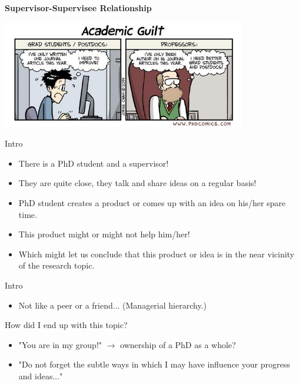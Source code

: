 \documentclass[aspectratio=169]{beamer}
\author{\authorlabel}
\newcommand{\mysubtitle}{\color{Pink}\Large{\textbf{Supervisor-Supervisee Relationship}}}
\begin{document}



\begin{frame}
	\centering
	\mysubtitle
\end{frame}

\begin{frame}
	\centering
  \includegraphics[width=0.8\textwidth]{Figures/comic.jpeg}
\end{frame}

\begin{frame}{Intro}
  \begin{itemize}
	\centering
    \item <1-6> There is a PhD student and a supervisor!
    \item <2-6> They are quite close, they talk and share ideas on a regular basis!
    \item <3-6> PhD student creates a product or comes up with an idea on his/her spare time.
    \item <4-6> This product might or might not help him/her!
    \item <5-6> Which might let us conclude that this product or idea is in the near vicinity of the research topic.
  \end{itemize}
  \centering
\end{frame}

\begin{frame}{Intro}
  \begin{itemize}
    \item Not like a peer or a friend... (Managerial hierarchy.)
  \end{itemize}
\end{frame}

\begin{frame}{How did I end up with this topic?}
  \begin{itemize}
    \item "You are in my group!" $\to$ ownership of a PhD as a whole?
    \item "Do not forget the subtle ways in which I may have influence your progress and ideas..."\cite{Parker-Jenkins2018}
  \end{itemize}
\end{frame}
\end{document}
